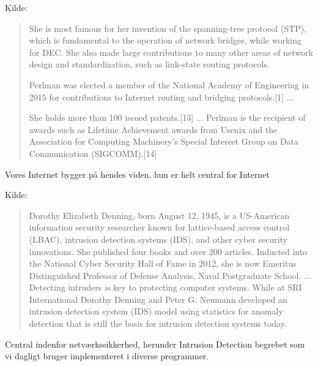 \documentclass[Screen16to9,17pt]{foils}
\begin{document}

Kilde:
\\

\begin{quote}
\vskip -2cm
She is most famous for her invention of the spanning-tree protocol (STP), which is fundamental to the operation of network bridges, while working for DEC. She also made large contributions to many other areas of network design and standardization, such as link-state routing protocols.

Perlman was elected a member of the National Academy of Engineering in 2015 for contributions to Internet routing and bridging protocols.[1]
...

She holds more than 100 issued patents.[13] ... Perlman is the recipient of awards such as Lifetime Achievement awards from Usenix and the Association for Computing Machinery’s Special Interest Group on Data Communication (SIGCOMM).[14]
\end{quote}

Vores Internet bygger på hendes viden, hun er helt central for Internet




Kilde: \\

\begin{quote}
\vskip -2cm
Dorothy Elizabeth Denning, born August 12, 1945, is a US-American information security researcher known for lattice-based access control (LBAC), intrusion detection systems (IDS), and other cyber security innovations. She published four books and over 200 articles. Inducted into the National Cyber Security Hall of Fame in 2012, she is now Emeritus Distinguished Professor of Defense Analysis, Naval Postgraduate School.
...
Detecting intruders is key to protecting computer systems. While at SRI International Dorothy Denning and Peter G. Neumann developed an intrusion detection system (IDS) model using statistics for anomaly detection that is still the basis for intrusion detection systems today.
\end{quote}


Central indenfor netværkssikkerhed, herunder Intrusion Detection begrebet som vi dagligt bruger implementeret i diverse programmer.
\end{document}
